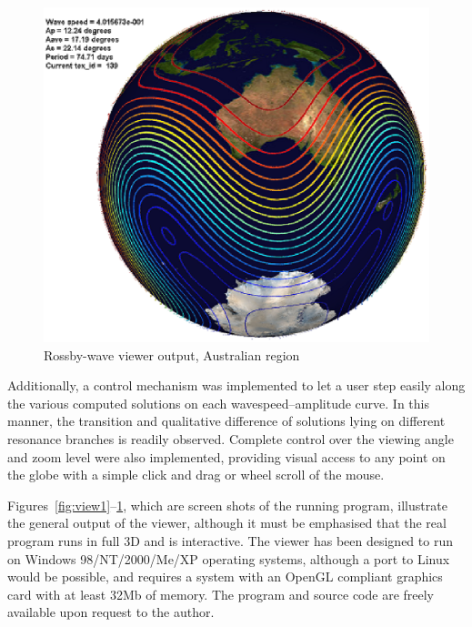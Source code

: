 \begin{figure}[htbp]
	\centering
		\includegraphics[scale=0.80]{viewer/view3.eps}
	\caption{Rossby-wave viewer output, Australian region}
	\label{fig:view3}
\end{figure} 

Additionally, a control mechanism was implemented to let a user step easily along the various computed solutions on each wavespeed--amplitude curve. In this manner, the transition and qualitative difference of solutions lying on different resonance branches is readily observed. Complete control over the viewing angle and zoom level were also implemented, providing visual access to any point on the globe with a simple click and drag or wheel scroll of the mouse. 

Figures~\ref{fig:view1}--\ref{fig:view3}, which are screen shots of the running program, illustrate the general output of the viewer, although it must be emphasised that the real program runs in full 3D and is interactive. The viewer has been designed to run on Windows 98/NT/2000/Me/XP operating systems, although a port to Linux would be possible, and requires a system with an OpenGL compliant graphics card with at least 32Mb of memory. The program and source code are freely available upon request to the author.